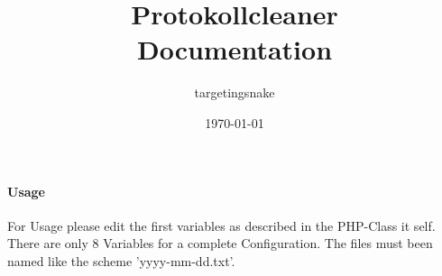 \documentclass[12pt,parskip=full, pagea4]{scrartcl}
\begin{document}
	\title{Protokollcleaner \\
		\large Documentation
	}
	\date{\today}
	\author{targetingsnake}
	
	\maketitle
	
	\paragraph{Usage} For Usage please edit the first variables as described in the PHP-Class it self. There are only 8 Variables for a complete Configuration. The files must been named like the scheme 'yyyy-mm-dd.txt'.
\end{document}
